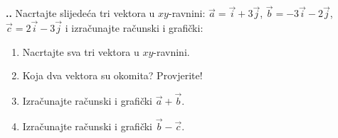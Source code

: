 \noindent 
\textbf{
\thecjelina.\thezadatak.}
Nacrtajte slijedeća tri vektora u $xy$-ravnini: $\vec{a}=\vec{i}+3\vec{j}$, 
$\vec{b}=-3\vec{i}-2\vec{j}$, 
$\vec{c}=2\vec{i}-3\vec{j}$ 
i izračunajte računski i grafički:
\begin{enumerate}[label=\alph*)]
 \item Nacrtajte sva tri vektora u $xy$-ravnini.
 \item Koja dva vektora su okomita? Provjerite!
 \item Izračunajte računski i grafički $\vec{a} + \vec{b}$.
 \item Izračunajte računski i grafički $\vec{b} - \vec{c} $.
\end{enumerate}

